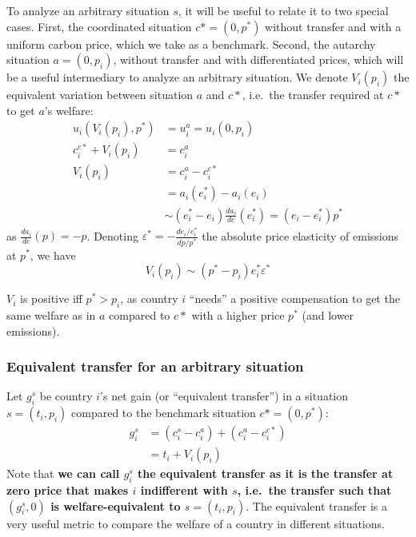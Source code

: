 \documentclass[12pt,english]{article}
\begin{document}
To analyze an arbitrary situation $s$, it will be useful to relate it to two special cases. First, the coordinated situation $c*=(0,p^*)$ without transfer and with a uniform carbon price, which we take as a benchmark. Second, the autarchy situation $a=(0, p_i)$, without transfer and with differentiated prices, which will be a useful intermediary to analyze an arbitrary situation. We denote $V_i(p_i)$ the equivalent variation between situation $a$ and $c*$, i.e.~the transfer required at $c*$ to get $a$'s welfare: 
$$\begin{aligned}
u_i(V_i(p_i), p^*)&=u^a_i=u_i(0, p_i) \\
c^{c*}_i + V_i(p_i) &= c^a_i \\
V_i(p_i) &= c^a_i - c^{c*}_i \\
&= a_i(e^*_i ) - a_i(e_i) \\
 &\sim  (e^*_i  - e_i) \frac{da_i}{de} (e^*_i ) = (e_i - e^*_i ) p^* 
\end{aligned}$$
as $\frac{da_i}{de} (p) = -p$.
Denoting $\varepsilon^* = -\frac{de_i/e^*_i }{dp/p^*}$ the absolute price elasticity of emissions at $p^*$, we have $$V_i(p_i) \sim (p^* - p_i) e^*_i  \varepsilon^* $$


$V_i$ is positive iff $p^* > p_i$, as country $i$ ``needs'' a positive compensation to get the same welfare as in $a$ compared to $c*$ with a higher price $p^*$ (and lower emissions).

\subsubsection*{Equivalent transfer for an arbitrary
situation}\label{equivalent-transfer-for-an-arbitrary-situation}

Let $g^s_i$ be country $i$'s net gain (or ``equivalent transfer'') in a situation $s=(t_i, p_i)$ compared to the benchmark situation $c*=(0,p^*)$: 
$$\begin{aligned}
g^s_i &= (c^s_i - c^a_i) + (c^a_i - c^{c*}_i) \\
 &= t_i + V_i(p_i)
\end{aligned}$$ 
Note that \textbf{we can call $g^s_i$ the equivalent transfer as it is the transfer at zero price that makes $i$ indifferent with $s$, i.e.~the transfer such that $(g^s_i, 0)$ is welfare-equivalent to $s=(t_i, p_i)$}. The equivalent transfer is a very useful metric to compare the welfare of a country in different situations.
\end{document}

